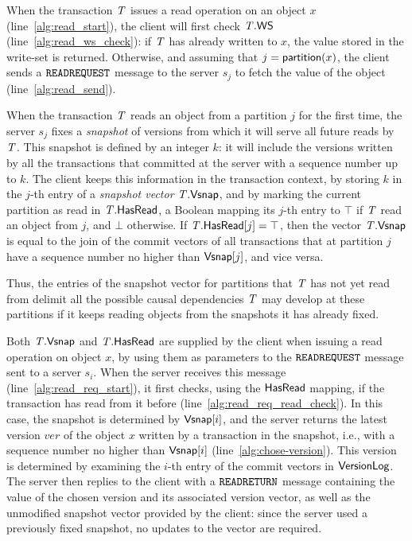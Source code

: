 When the transaction $\mathit{T}$ issues a read operation on an object $x$ (line~\ref{alg:read_start}), the client will first check $\mathit{T}.\mathsf{WS}$ (line~\ref{alg:read_ws_check}): if $\mathit{T}$ has already written to $x$, the value stored in the write-set is returned. Otherwise, and assuming that $j = \mathsf{partition}(x)$, the client sends a ${\tt READREQUEST}$ message to the server $s_j$ to fetch the value of the object (line~\ref{alg:read_send}).

When the transaction $\mathit{T}$ reads an object from a partition $j$ for the first time, the server $s_j$ fixes a \emph{snapshot} of versions from which it will serve all future reads by $\mathit{T}$. This snapshot is defined by an integer $k$: it will include the versions written by all the transactions that committed at the server with a sequence number up to $k$. The client keeps this information in the transaction context, by storing $k$ in the $j$-th entry of a \emph{snapshot vector} $\mathit{T}.\mathsf{Vsnap}$, and by marking the current partition as read in $\mathit{T}.\mathsf{HasRead}$, a Boolean mapping its $j$-th entry to $\top$ if $\mathit{T}$ read an object from $j$, and $\bot$ otherwise. If $\mathit{T}.\mathsf{HasRead}[j]=\top$, then the vector $\mathit{T}.\mathsf{Vsnap}$ is equal to the join of the commit vectors of all transactions that at partition $j$ have a sequence number no higher than $\mathsf{Vsnap}[j]$, and vice versa.

 Thus, the entries of the snapshot vector for partitions that $\mathit{T}$ has not yet read from delimit all the possible causal dependencies $\mathit{T}$ may develop at these partitions if it keeps reading objects from the snapshots it has already fixed.

Both $\mathit{T}.\mathsf{Vsnap}$ and $\mathit{T}.\mathsf{HasRead}$ are supplied by the client when issuing a read operation on object $x$, by using them as parameters to the ${\tt READREQUEST}$ message sent to a server $s_i$. When the server receives this message (line~\ref{alg:read_req_start}), it first checks, using the $\mathsf{HasRead}$ mapping, if the transaction has read from it before (line~\ref{alg:read_req_read_check}). In this case, the snapshot is determined by $\mathsf{Vsnap}[i]$, and the server returns the latest version $\mathit{ver}$ of the object $x$ written by a transaction in the snapshot, i.e., with a sequence number no higher than $\mathsf{Vsnap}[i]$ (line~\ref{alg:chose-version}). This version is determined by examining the $i$-th entry of the commit vectors in $\mathsf{VersionLog}$. The server then replies to the client with a ${\tt READRETURN}$ message containing the value of the chosen version and its associated version vector, as well as the unmodified snapshot vector provided by the client: since the server used a previously fixed snapshot, no updates to the vector are required.

